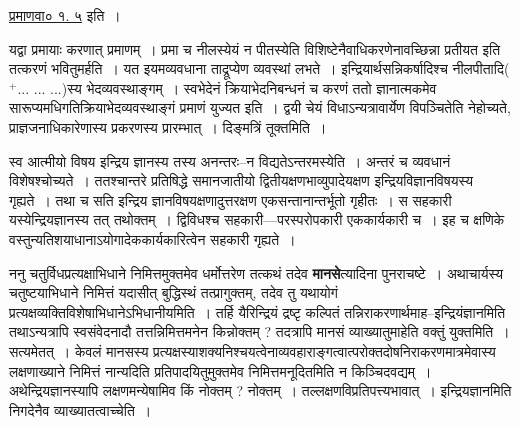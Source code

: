 \documentclass[article,12pt,a4paper]{memoir}
\newcommand{\add}[1]{($^{+}$#1)}
\begin{document}
	
	    \pstart
	   \href{http://sarit.indology.info/?cref=pv.1.5}{प्रमाणवा० १. ५} इति ।
	\pend
      

	  \pstart यद्वा प्रमायाः करणात् प्रमाणम् । प्रमा च नीलस्येयं न पीतस्येति विशिष्टेनैवाधिकरणेनावच्छिन्ना प्रतीयत इति तत्करणं भवितुमर्हति । यत इयमव्यवधाना ताद्रूप्येण व्यवस्थां लभते । इन्द्रियार्थसन्निकर्षादिश्च नीलपीतादि\add{... ... ...}स्य भेदव्यवस्थाङ्गम् । स्वभेदेनं क्रियाभेदनिबन्धनं च करणं ततो ज्ञानात्मकमेव सारूप्यमधिगतिक्रियाभेदव्यवस्थाङ्गं प्रमाणं युज्यत इति । द्वयी चेयं विधाऽन्यत्रावार्येण विपञ्चितेति नेहोच्यते, प्राज्ञजनाधिकारेणास्य प्रकरणस्य प्रारम्भात् । दिङ्मत्रिं तूक्तमिति ।
	\pend
	  \bigskip
	  \begingroup
	

	  \pstart स्व आत्मीयो विषय इन्द्रिय ज्ञानस्य तस्य अनन्तरः--न विद्यतेऽन्तरमस्येति । अन्तरं च व्यवधानं विशेषश्चोच्यते । ततश्चान्तरे प्रतिषिद्धे समानजातीयो द्वितीयक्षणभाव्युपादेयक्षण इन्द्रियविज्ञानविषयस्य गृह्यते । तथा च सति इन्द्रिय ज्ञानविषयक्षणादुत्तरक्षण एकसन्तानान्तर्भूतो गृहीतः । स सहकारी यस्येन्द्रियज्ञानस्य तत् तथोक्तम् । द्विविधश्च सहकारी—परस्परोपकारी एककार्यकारी च । इह च क्षणिके वस्तुन्यतिशयाधानाऽयोगादेककार्यकारित्वेन सहकारी गृह्यते ।
	\pend
      
	  \endgroup
	

	  \pstart ननु चतुर्विधप्रत्यक्षाभिधाने निमित्तमुक्तमेव धर्मोत्तरेण तत्कथं तदेव \textbf{मानसे}त्यादिना पुनराचष्टे । अथाचार्यस्य चतुष्टयाभिधाने निमित्तं यदासीत् बुद्धिस्थं तत्प्रागुक्तम्, तदेव तु यथायोगं प्रत्यक्षव्यक्तिविशेषाभिधानेऽभिधानीयमिति । तर्हि यैरिन्द्रियं द्रष्टृ कल्पितं तन्निराकरणार्थमाह--इन्द्रियंज्ञानमिति तथाऽन्यत्रापि स्वसंवेदनादौ तत्तन्निमित्तमनेन किन्नोक्तम् ? तदत्रापि मानसं व्याख्यातुमाहेति वक्तुं युक्तमिति । सत्यमेतत् । केवलं मानसस्य प्रत्यक्षस्याशक्यनिश्चयत्वेनाव्यवहाराङ्गत्वात्परोक्तदोषनिराकरणमात्रमेवास्य लक्षणाख्याने निमित्तं नान्यदिति प्रतिपादयितुमुक्तमेव निमित्तमनूदितमिति न किञ्चिदवद्यम् । अथेन्द्रियज्ञानस्यापि लक्षण\leavevmode{}मन्येषामिव किं नोक्तम् ? नोक्तम् । तल्लक्षणविप्रतिपत्त्यभावात् । इन्द्रियज्ञानमिति निगदेनैव व्याख्यातत्वाच्चेति ।
	\pend
      
\end{document}
